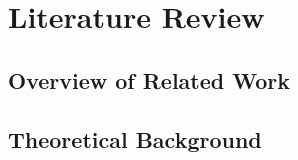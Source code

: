\chapter{Literature Review}
\section{Overview of Related Work}
\lipsum[5-6]

\section{Theoretical Background}
\lipsum[7-8]
